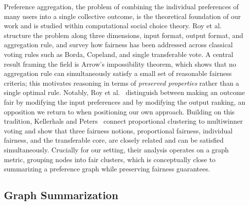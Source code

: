\documentclass[a4paper,fleqn]{cas-dc}
\begin{document}
Preference aggregation, the problem of combining the individual preferences
of many users into a single collective outcome, is the theoretical foundation
of our work and is studied within computational social choice theory. Roy et
al.~\citeyearpar{roy_fairness_2024} structure the problem along three dimensions,
input format, output format, and aggregation rule, and survey how fairness
has been addressed across classical voting rules such as Borda, Copeland, and
single transferable vote. A central result framing the field is Arrow's
impossibility theorem, which shows that no aggregation rule can simultaneously
satisfy a small set of reasonable fairness criteria; this motivates reasoning
in terms of \emph{preserved properties} rather than a single optimal rule.
Notably, Roy et al.~\citeyearpar{roy_fairness_2024} distinguish between making an
outcome fair by modifying the input preferences and by modifying the output
ranking, an opposition we return to when positioning our own approach.
Building on this tradition, Kellerhals and Peters~\citeyearpar{kellerhals_proportional_2024}
connect proportional clustering to multiwinner voting and show that three fairness notions, proportional fairness, individual fairness, and the transferable core, are closely related and can be satisfied simultaneously. Crucially for our setting, their analysis operates on a graph metric, grouping nodes into fair clusters, which is conceptually close to summarizing a preference graph while preserving fairness guarantees.

\subsection{Graph Summarization}
\end{document}
